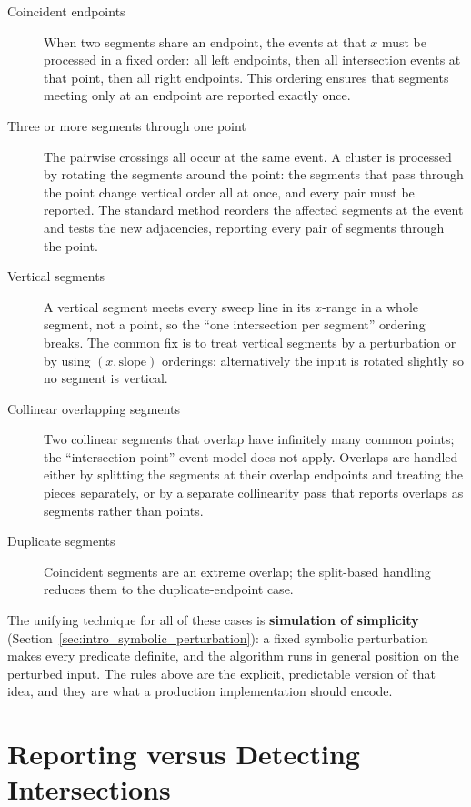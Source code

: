 \begin{description}
  \item[Coincident endpoints] When two segments share an endpoint, the
    events at that $x$ must be processed in a fixed order: all left
    endpoints, then all intersection events at that point, then all right
    endpoints. This ordering ensures that segments meeting only at an
    endpoint are reported exactly once.
  \item[Three or more segments through one point] The pairwise crossings
    all occur at the same event. A cluster is processed by rotating the
    segments around the point: the segments that pass through the point
    change vertical order all at once, and every pair must be reported. The
    standard method reorders the affected segments at the event and tests
    the new adjacencies, reporting every pair of segments through the
    point.
  \item[Vertical segments] A vertical segment meets every sweep line in its
    $x$-range in a whole segment, not a point, so the ``one intersection
    per segment'' ordering breaks. The common fix is to treat vertical
    segments by a perturbation or by using $(x, \text{slope})$ orderings;
    alternatively the input is rotated slightly so no segment is vertical.
  \item[Collinear overlapping segments] Two collinear segments that overlap
    have infinitely many common points; the ``intersection point'' event
    model does not apply. Overlaps are handled either by splitting the
    segments at their overlap endpoints and treating the pieces separately,
    or by a separate collinearity pass that reports overlaps as segments
    rather than points.
  \item[Duplicate segments] Coincident segments are an extreme overlap; the
    split-based handling reduces them to the duplicate-endpoint case.
\end{description}

The unifying technique for all of these cases is \textbf{simulation of
simplicity} (Section~\ref{sec:intro_symbolic_perturbation}): a fixed
symbolic perturbation makes every predicate definite, and the algorithm runs
in general position on the perturbed input. The rules above are the explicit,
predictable version of that idea, and they are what a production
implementation should encode.


\section{Reporting versus Detecting Intersections}
\label{sec:segint_reporting}

